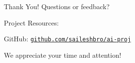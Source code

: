 \documentclass[aspectratio=169]{beamer}
\begin{document}
\section*{}
\begin{frame}{Thank You!}
  Questions or feedback?

  Project Resources:
  \vspace{-0.5em}

  {\footnotesize
  GitHub: {\texttt{\href{https://github.com/saileshbro/ai-proj}{github.com/saileshbro/ai-proj}}}}

  \vspace{-1em}

  We appreciate your time and attention!
\end{frame}
\end{document}

